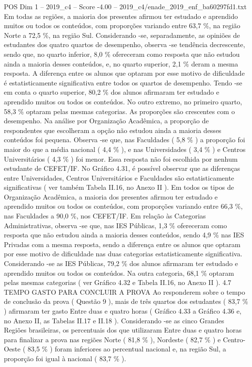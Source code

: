 \begin{textsample}{POS Dim 1 – 2019\_c4 – Score -4.00 – 2019\_c4/enade\_2019\_enf\_ba60297fd1.txt}
Em todas as regiões, a maioria dos presentes afirmou ter estudado e aprendido muitos ou todos os conteúdos, com proporções variando entre 63,7 \%, na região Norte a 72,5 \%, na região Sul.
Considerando -se, separadamente, as opiniões de estudantes dos quatro quartos de desempenho, observa -se tendência decrescente, sendo que, no quarto inferior, 8,0 \% ofereceram como resposta que não estudou ainda a maioria desses conteúdos, e, no quarto superior, 2,1 \% deram a mesma resposta.
A diferença entre os alunos que optaram por esse motivo de dificuldade é estatisticamente significativa entre todos os quartos de desempenho.
Tendo -se em conta o quarto superior, 80,2 \% dos alunos afirmaram ter estudado e aprendido muitos ou todos os conteúdos.
No outro extremo, no primeiro quarto, 58,3 \% optaram pelas mesmas categorias.
As proporções são crescentes com o desempenho.
Na análise por Organização Acadêmica, a proporção de respondentes que escolheram a opção não estudou ainda a maioria desses conteúdos foi pequena.
Observa -se que, nas Faculdades ( 5,8 \% ) a proporção foi maior do que a média nacional ( 4,4 \% ), e nas Universidades ( 3,4 \% ) e Centros Universitários ( 4,3 \% ) foi menor.
Essa resposta não foi escolhida por nenhum estudante de CEFET/IF.
No Gráfico 4.31, é possível observar que as diferenças entre Universidades, Centros Universitários e Faculdades são estatisticamente significativas ( ver também Tabela II.16, no Anexo II ).
Em todos os tipos de Organização Acadêmica, a maioria dos presentes afirmou ter estudado e aprendido muitos ou todos os conteúdos, com proporções variando entre 66,3 \%, nas Faculdades a 90,0 \%, nos CEFET/IF.
Em relação às Categorias Administrativas, observa -se que, nas IES Públicas, 1,3 \% ofereceram como resposta que não estudou ainda a maioria desses conteúdos, sendo 4,9 \% nas IES Privadas com a mesma resposta, sendo a diferença entre os alunos que optaram por esse motivo de dificuldade nas duas categorias estatisticamente significativa.
Considerando -se as IES Públicas, 79,2 \% dos alunos afirmaram ter estudado e aprendido muitos ou todos os conteúdos.
Na outra categoria, 68,1 \% optaram pelas mesmas categorias ( ver Gráfico 4.32 e Tabela II.16, no Anexo II ). 4.7 TEMPO GASTO PARA CONCLUIR A PROVA Ao responderem sobre o tempo de conclusão da prova ( Questão 9 ), mais de três quartos dos estudantes ( 83,7 \% ) afirmaram ter gasto Entre duas e quatro horas ( Gráfico 4.33 a Gráfico 4.36 e, no Anexo II, as Tabelas II.17 e II.18 ).
Considerando -se as cinco Grandes Regiões brasileiras, os percentuais dos que utilizaram Entre duas e quatro horas para finalizar a prova nas regiões Norte ( 81,8 \% ), Nordeste ( 82,7 \% ) e Centro-Oeste ( 83,5 \% ) foram inferiores ao percentual nacional e, na região Sul, a proporção foi igual à nacional ( 83,7 \% ).

\end{textsample}
